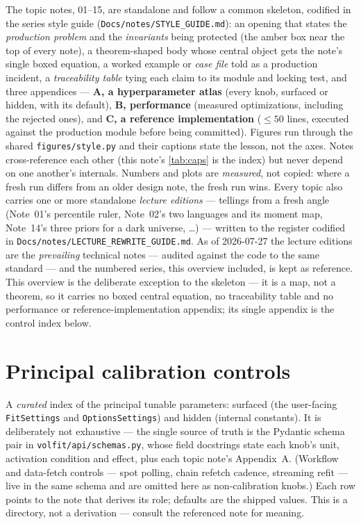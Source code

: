 \documentclass[11pt]{article}
\begin{document}
The topic notes, 01--15, are standalone and follow a common skeleton,
codified in the series style guide
(\texttt{Docs/notes/STYLE\_GUIDE.md}): an opening that states the
\emph{production problem} and the \emph{invariants} being protected (the
amber box near the top of every note), a theorem-shaped body whose central
object gets the note's single boxed equation, a worked example or
\emph{case file} told as a production incident, a \emph{traceability table}
tying each claim to its module and locking test, and three appendices ---
\textbf{A, a hyperparameter atlas} (every knob, surfaced or hidden, with its
default), \textbf{B, performance} (measured optimizations, including the
rejected ones), and \textbf{C, a reference implementation} ($\le50$ lines,
executed against the production module before being committed). Figures run
through the shared \texttt{figures/style.py} and their captions state the
lesson, not the axes. Notes cross-reference each other (this note's
\cref{tab:caps} is the index) but never depend on one another's internals.
Numbers and plots are \emph{measured}, not copied: where a fresh run differs
from an older design note, the fresh run wins. Every topic also carries one
or more standalone \emph{lecture editions} ---
tellings from a fresh angle (Note~01's percentile ruler, Note~02's two
languages and its moment map, Note~14's three priors for a dark universe,
\dots) --- written to the register codified in
\texttt{Docs/notes/LECTURE\_REWRITE\_GUIDE.md}.  As of 2026-07-27 the
lecture editions are the \emph{prevailing} technical notes --- audited
against the code to the same standard --- and the numbered series,
this overview included, is kept as reference.  This overview is the deliberate
exception to the skeleton --- it is a map, not a theorem, so it carries no
boxed central equation, no traceability table and no performance or
reference-implementation appendix; its single appendix is the control index
below.

\appendix
\section{Principal calibration controls}
\label{app:master}

A \emph{curated} index of the principal tunable parameters: surfaced (the
user-facing \texttt{FitSettings} and \texttt{OptionsSettings}) and hidden
(internal constants). It is deliberately not exhaustive --- the single source
of truth is the Pydantic schema pair in \texttt{volfit/api/schemas.py}, whose
field docstrings state each knob's unit, activation condition and effect, plus
each topic note's Appendix~A. (Workflow and data-fetch controls ---
spot polling, chain refetch cadence, streaming refit --- live in the same
schema and are omitted here as non-calibration knobs.) Each row points to the
note that derives its role; defaults are the shipped values. This is a
directory, not a derivation --- consult the referenced note for meaning.
\end{document}
